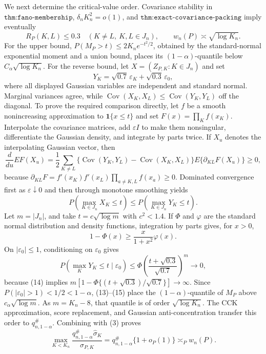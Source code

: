 We next determine the critical-value order.  Covariance stability in \(\texttt{thm:fano-membership}\), \(\delta_nK_n^2=o(1)\), and \(\texttt{thm:exact-covariance-packing}\) imply eventually
\[
 R_P(K,L)\leq0.3\quad(K\neq L,\ K,L\in J_n),
 \qquad w_n(P)\asymp\sqrt{\log K_n}.                                        \tag{11}
\]
For the upper bound, \(P(M_P>t)\leq2K_ne^{-t^2/2}\), obtained by the standard-normal exponential moment and a union bound, places its \((1-\alpha)\)-quantile below \(C_\alpha\sqrt{\log K_n}\).  For the reverse bound, let \(X=(Z_{P,K}:K\in J_n)\) and set
\[
 Y_K=\sqrt{0.7}\,\varepsilon_K+\sqrt{0.3}\,\varepsilon_0,
\]
where all displayed Gaussian variables are independent and standard normal.  Marginal variances agree, while \(\operatorname{Cov}(X_K,X_L)\leq\operatorname{Cov}(Y_K,Y_L)\) off the diagonal.  To prove the required comparison directly, let \(f\) be a smooth nonincreasing approximation to \(\mathbf1\{x\leq t\}\) and set \(F(x)=\prod_Kf(x_K)\).  Interpolate the covariance matrices, add \(\varepsilon I\) to make them nonsingular, differentiate the Gaussian density, and integrate by parts twice.  If \(X_u\) denotes the interpolating Gaussian vector, then
\[
 \frac d{du}E F(X_u)=\frac12\sum_{K\neq L}
 \{\operatorname{Cov}(Y_K,Y_L)-\operatorname{Cov}(X_K,X_L)\}
 E\{\partial_{KL}F(X_u)\}\geq0,                                            \tag{12}
\]
because \(\partial_{KL}F=f'(x_K)f'(x_L)\prod_{a\neq K,L}f(x_a)\geq0\).  Dominated convergence first as \(\varepsilon\downarrow0\) and then through monotone smoothing yields
\[
 P(\max_{K\in J_n}X_K\leq t)\leq P(\max_{K\in J_n}Y_K\leq t).             \tag{13}
\]
Let \(m=|J_n|\), and take \(t=c\sqrt{\log m}\) with \(c^2<1.4\).  If \(\Phi\) and \(\varphi\) are the standard normal distribution and density functions, integration by parts gives, for \(x>0\),
\[
 1-\Phi(x)\geq\frac{x}{1+x^2}\varphi(x).                                   \tag{14}
\]
On \(|\varepsilon_0|\leq1\), conditioning on \(\varepsilon_0\) gives
\[
 P(\max_KY_K\leq t\mid\varepsilon_0)
 \leq\Phi\!\left(\frac{t+\sqrt{0.3}}{\sqrt{0.7}}\right)^m\longrightarrow0, \tag{15}
\]
because (14) implies \(m[1-\Phi\{(t+\sqrt{0.3})/\sqrt{0.7}\}]\to\infty\).  Since \(P(|\varepsilon_0|>1)<1/2<1-\alpha\), (13)--(15) place the \((1-\alpha)\)-quantile of \(M_P\) above \(c_\alpha\sqrt{\log m}\).  As \(m=K_n-8\), that quantile is of order \(\sqrt{\log K_n}\).  The CCK approximation, score replacement, and Gaussian anti-concentration transfer this order to \(q_{n,1-\alpha}^{\#}\).  Combining with (3) proves
\[
 \max_{K<K_n}\frac{q_{n,1-\alpha}^{\#}\widehat\sigma_K}{\sigma_{P,K}}
 =q_{n,1-\alpha}^{\#}\{1+o_P(1)\}\asymp_P w_n(P).                         \tag{16}
\]

